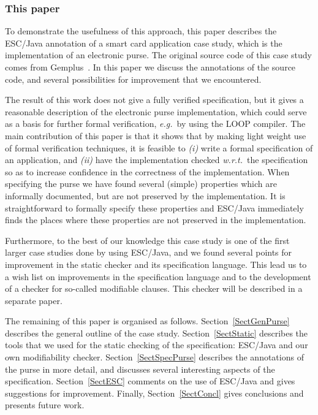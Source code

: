 \documentclass[a4paper]{llncs}
\begin{document}
\subsubsection{This paper}
To demonstrate the usefulness of this approach, this paper describes
the ESC/Java annotation of a smart card application case study, which
is the implementation of an electronic purse. The original source code
of this case study comes from Gemplus~\cite{PurseUrl}. In this
paper we discuss the annotations of the source code, and several
possibilities for improvement that we encountered.

The result of this work does not give a fully verified specification,
but it gives a reasonable description of the electronic purse
implementation, which could serve as a basis for further formal
verification, \emph{e.g.}~by using the LOOP compiler.  The main
contribution of this paper is that it shows that by making light
weight use of formal verification techniques, it is feasible to
\emph{(i)} write a formal specification of an application, and
\emph{(ii)} have the implementation checked \emph{w.r.t.}~the 
specification so as to increase confidence in the correctness of the
implementation. When specifying the purse we have found several
(simple) properties which are informally documented, but are not
preserved by the implementation. It is straightforward to formally
specify these properties and ESC/Java immediately finds the places
where these properties are not preserved in the implementation.

Furthermore, to the best of our knowledge this case study is one of
the first larger case studies done by using ESC/Java, and we found
several points for improvement in the static checker and its
specification language. This lead us to a wish list on improvements in
the specification language and to the development of a checker for
so-called modifiable clauses. This checker will be described in a
separate paper.%

The remaining of this paper is organised as
follows. Section~\ref{SectGenPurse} describes the general outline of
the case study. Section~\ref{SectStatic} describes the tools that we
used for the static checking of the specification: ESC/Java and our
own modifiability checker. Section~\ref{SectSpecPurse} describes the
annotations of the purse in more detail, and discusses several
interesting aspects of the specification. Section~\ref{SectESC}
comments on the use of ESC/Java and gives suggestions for
improvement. Finally, Section~\ref{SectConcl} gives conclusions and
presents future work.
\end{document}
